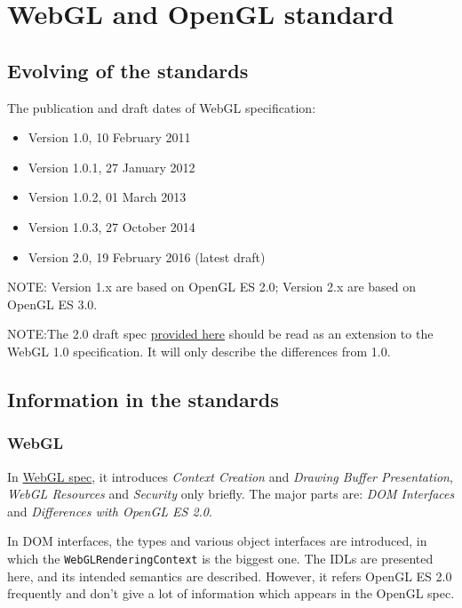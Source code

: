 \section{WebGL and OpenGL standard}\label{webgl-and-opengl-standard}

\subsection{Evolving of the standards}\label{evolving-of-the-standards}

The publication and draft dates of WebGL specification:

\begin{itemize}
\tightlist
\item
  Version 1.0, 10 February 2011
\item
  Version 1.0.1, 27 January 2012
\item
  Version 1.0.2, 01 March 2013
\item
  Version 1.0.3, 27 October 2014
\item
  Version 2.0, 19 February 2016 (latest draft)
\end{itemize}

NOTE: Version 1.x are based on OpenGL ES 2.0; Version 2.x are based on
OpenGL ES 3.0.

NOTE:The 2.0 draft spec
\href{https://www.khronos.org/registry/webgl/specs/latest/2.0}{provided
here} should be read as an extension to the WebGL 1.0 specification. It
will only describe the differences from 1.0.

\subsection{Information in the
standards}\label{information-in-the-standards}

\subsubsection{WebGL}\label{webgl}

In \href{https://www.khronos.org/registry/webgl/specs/latest/1.0/}{WebGL
spec}, it introduces \emph{Context Creation} and \emph{Drawing Buffer
Presentation}, \emph{WebGL Resources} and \emph{Security} only briefly.
The major parts are: \emph{DOM Interfaces} and \emph{Differences with
OpenGL ES 2.0}.

In DOM interfaces, the types and various object interfaces are
introduced, in which the \texttt{WebGLRenderingContext} is the biggest
one. The IDLs are presented here, and its intended semantics are
described. However, it refers OpenGL ES 2.0 frequently and don't give a
lot of information which appears in the OpenGL spec.

